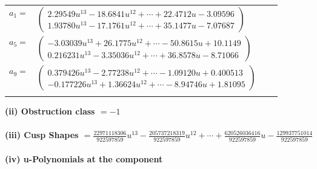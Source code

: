 \documentclass[1p]{elsarticle_modified}
\theoremstyle{definition}
\begin{document}
\begin{tabular}{m{7pt} m{180pt} m{7pt} m{180pt} }
\flushright $a_{1}=$&$\begin{pmatrix}2.29549 u^{13}-18.6841 u^{12}+\cdots+22.4712 u-3.09596\\1.93780 u^{13}-17.1761 u^{12}+\cdots+35.1477 u-7.07687\end{pmatrix}$ \\
\flushright $a_{5}=$&$\begin{pmatrix}-3.03039 u^{13}+26.1775 u^{12}+\cdots-50.8615 u+10.1149\\0.216231 u^{13}-3.35036 u^{12}+\cdots+36.8578 u-8.71066\end{pmatrix}$ \\
\flushright $a_{9}=$&$\begin{pmatrix}0.379426 u^{13}-2.77238 u^{12}+\cdots-1.09120 u+0.400513\\-0.177226 u^{13}+1.36624 u^{12}+\cdots-8.94746 u+1.81095\end{pmatrix}$\\&\end{tabular}
\flushleft \textbf{(ii) Obstruction class $= -1$}\\~\\
\flushleft \textbf{(iii) Cusp Shapes $= \frac{22971118306}{922597859} u^{13}-\frac{205737218319}{922597859} u^{12}+\cdots+\frac{620526036416}{922597859} u-\frac{129937751014}{922597859}$}\\~\\
\newpage\renewcommand{\arraystretch}{1}
\flushleft \textbf{(iv) u-Polynomials at the component}\newline \\
\end{document}
